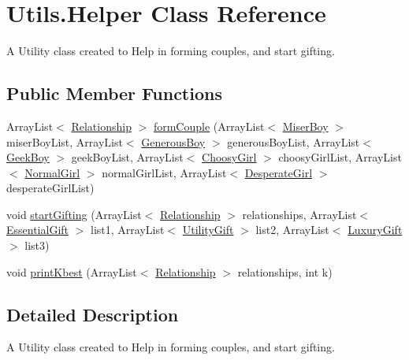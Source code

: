 \hypertarget{class_utils_1_1_helper}{}\section{Utils.\+Helper Class Reference}
\label{class_utils_1_1_helper}


A Utility class created to Help in forming couples, and start gifting.  


\subsection*{Public Member Functions}
\begin{DoxyCompactItemize}
\item 
Array\+List$<$ \hyperlink{class_utils_1_1_relationship}{Relationship} $>$ \hyperlink{class_utils_1_1_helper_a6f1c53ad1e8be4c45607b2f2a54dc455}{form\+Couple} (Array\+List$<$ \hyperlink{class_boys_1_1_miser_boy}{Miser\+Boy} $>$ miser\+Boy\+List, Array\+List$<$ \hyperlink{class_boys_1_1_generous_boy}{Generous\+Boy} $>$ generous\+Boy\+List, Array\+List$<$ \hyperlink{class_boys_1_1_geek_boy}{Geek\+Boy} $>$ geek\+Boy\+List, Array\+List$<$ \hyperlink{class_girls_1_1_choosy_girl}{Choosy\+Girl} $>$ choosy\+Girl\+List, Array\+List$<$ \hyperlink{class_girls_1_1_normal_girl}{Normal\+Girl} $>$ normal\+Girl\+List, Array\+List$<$ \hyperlink{class_girls_1_1_desperate_girl}{Desperate\+Girl} $>$ desperate\+Girl\+List)
\item 
void \hyperlink{class_utils_1_1_helper_accb2d53aa3151a05c19f51728ee92977}{start\+Gifting} (Array\+List$<$ \hyperlink{class_utils_1_1_relationship}{Relationship} $>$ relationships, Array\+List$<$ \hyperlink{class_gifts_1_1_essential_gift}{Essential\+Gift} $>$ list1, Array\+List$<$ \hyperlink{class_gifts_1_1_utility_gift}{Utility\+Gift} $>$ list2, Array\+List$<$ \hyperlink{class_gifts_1_1_luxury_gift}{Luxury\+Gift} $>$ list3)
\item 
void \hyperlink{class_utils_1_1_helper_a16d1ffc86896f16d999a016abe9a7fbd}{print\+Kbest} (Array\+List$<$ \hyperlink{class_utils_1_1_relationship}{Relationship} $>$ relationships, int k)
\end{DoxyCompactItemize}


\subsection{Detailed Description}
A Utility class created to Help in forming couples, and start gifting. 

